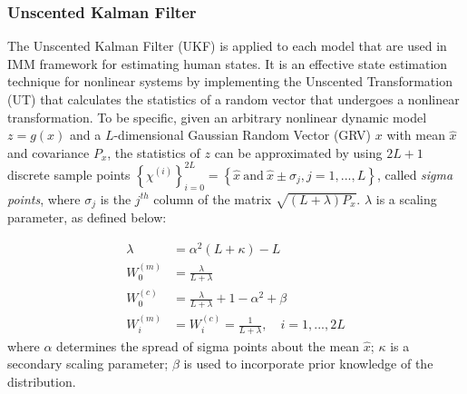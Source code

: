 \documentclass[letterpaper, 10 pt, conference]{ieeeconf}
\begin{document}
	\subsubsection{Unscented Kalman Filter}\label{subsec:UKF}
	The Unscented Kalman Filter (UKF) is applied to each model that are used in IMM framework for estimating human states. 
	It is an effective state estimation technique for nonlinear systems by implementing the Unscented Transformation (UT) that calculates the statistics of a random vector that undergoes a nonlinear transformation\cite {haykin2004kalman}.
	To be specific, given an arbitrary nonlinear dynamic model $z=g(x)$ and a $L$-dimensional Gaussian Random Vector (GRV) $x$ with mean $\hat{x}$ and covariance $P_x$, the statistics of $z$ can be approximated by using $2L+1$ discrete sample points $\left\{\chi^{(i)} \right\}_{i=0}^{2L}=\left\{ \hat{x}\ \text{and}\  \hat{x} \pm \sigma_j, j=1,...,L\right \}$, called \textit{sigma points}, where $\sigma_j$ is the $j^{th}$ column of the matrix $\sqrt{(L+\lambda)P_x}$. $\lambda$ is a scaling parameter, as defined below:
	
	\begin{subequations}
		\begin{align}
		\lambda&=\alpha^2(L+\kappa)-L  \label{eqn:ukf}\\
		W_0^{(m)}&=\frac{\lambda}{L+\lambda}\\
		W_0^{(c)}&=\frac{\lambda}{L+\lambda}+1-\alpha^2+\beta\\
		W_i^{(m)}&=W_i^{(c)}=\frac{1}{L+\lambda},\quad i=1,...,2L 
		\end{align}
	\end{subequations}
	where $\alpha$ determines the spread of sigma points about the mean $\hat{x}$; $\kappa$ is a secondary scaling parameter; $\beta$ is used to incorporate prior knowledge of the distribution.	
	
\end{document}

